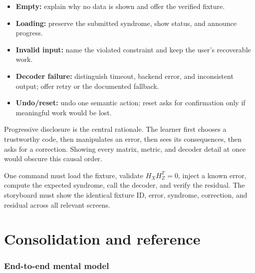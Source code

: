 \documentclass[11pt]{article}
\begin{document}
\begin{itemize}
  \item \textbf{Empty:} explain why no data is shown and offer the verified fixture.
  \item \textbf{Loading:} preserve the submitted syndrome, show status, and announce progress.
  \item \textbf{Invalid input:} name the violated constraint and keep the user's recoverable work.
  \item \textbf{Decoder failure:} distinguish timeout, backend error, and inconsistent output; offer retry
  or the documented fallback.
  \item \textbf{Undo/reset:} undo one semantic action; reset asks for confirmation only if meaningful
  work would be lost.
\end{itemize}

\begin{hcibox}
Progressive disclosure is the central rationale. The learner first chooses a trustworthy code, then
manipulates an error, then sees its consequences, then asks for a correction. Showing every matrix,
metric, and decoder detail at once would obscure this causal order.
\end{hcibox}

\begin{masterybox}[title={Week 2 pass condition}]
One command must load the fixture, validate \(H_XH_Z^T=0\), inject a known error, compute the
expected syndrome, call the decoder, and verify the residual. The storyboard must show the identical
fixture ID, error, syndrome, correction, and residual across all relevant screens.
\end{masterybox}

\part{Consolidation and reference}

\section{End-to-end mental model}
\end{document}
